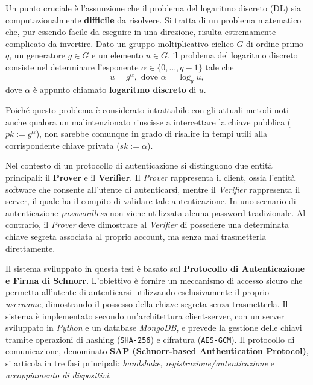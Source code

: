 Un punto cruciale è l'assunzione che il problema del logaritmo discreto (DL) sia computazionalmente \textbf{difficile} da risolvere. Si tratta di un problema matematico che, pur essendo facile da eseguire in una direzione, risulta estremamente complicato da invertire. Dato un gruppo moltiplicativo ciclico $G$ di ordine primo $q$, un generatore $g \in G$ e un elemento $u \in G$, il problema del logaritmo discreto consiste nel determinare l'esponente $\alpha \in \{0, \dots, q-1\}$ tale che 
\[
u = g^\alpha, \text{ dove } \alpha = \log_gu,
\]
dove $\alpha$ è appunto chiamato \textbf{logaritmo discreto} di $u$.

Poiché questo problema è considerato intrattabile con gli attuali metodi noti anche qualora un malintenzionato riuscisse a intercettare la chiave pubblica ($pk := g^\alpha$), non sarebbe comunque in grado di risalire in tempi utili alla corrispondente chiave privata ($sk := \alpha$).

Nel contesto di un protocollo di autenticazione si distinguono due entità principali: il \textbf{Prover} e il \textbf{Verifier}.
Il \textit{Prover} rappresenta il client, ossia l'entità software che consente all'utente di autenticarsi, mentre il \textit{Verifier} rappresenta il server, il quale ha il compito di validare tale autenticazione. In uno scenario di autenticazione \textit{passwordless} non viene utilizzata alcuna password tradizionale. Al contrario, il \textit{Prover} deve dimostrare al \textit{Verifier} di possedere una determinata chiave segreta associata al proprio account, ma senza mai trasmetterla direttamente. 

Il sistema sviluppato in questa tesi è basato sul \textbf{Protocollo di Autenticazione e Firma di Schnorr}. L'obiettivo è fornire un meccanismo di accesso sicuro che permetta all'utente di autenticarsi utilizzando esclusivamente il proprio \textit{username}, dimostrando il possesso della chiave segreta senza trasmetterla. Il sistema è implementato secondo un'architettura client-server, con un server sviluppato in \textit{Python} e un database \textit{MongoDB}, e prevede la gestione delle chiavi tramite operazioni di hashing (\texttt{SHA-256}) e cifratura (\texttt{AES-GCM}). Il protocollo di comunicazione, denominato \textbf{SAP (Schnorr-based Authentication Protocol)}, si articola in tre fasi principali: \textit{handshake}, \textit{registrazione/autenticazione} e \textit{accoppiamento di dispositivi}.


